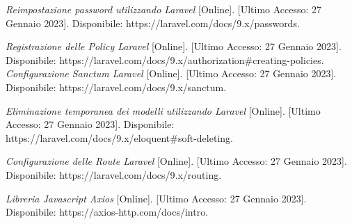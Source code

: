 \begin{thebibliography}{999}
{\em Reimpostazione password utilizzando Laravel} [Online]. [Ultimo Accesso: 27 Gennaio 2023].
Disponibile: https://laravel.com/docs/9.x/passwords.

{\em Registrazione delle Policy Laravel} [Online]. [Ultimo Accesso: 27 Gennaio 2023].
Disponibile: https://laravel.com/docs/9.x/authorization\#creating-policies.
{\em Configurazione Sanctum Laravel} [Online]. [Ultimo Accesso: 27 Gennaio 2023].
Disponibile: https://laravel.com/docs/9.x/sanctum.


{\em Eliminazione temporanea dei modelli utilizzando Laravel} [Online]. [Ultimo Accesso: 27 Gennaio 2023].
Disponibile: https://laravel.com/docs/9.x/eloquent\#soft-deleting.

{\em Configurazione delle Route Laravel} [Online]. [Ultimo Accesso: 27 Gennaio 2023].
Disponibile: https://laravel.com/docs/9.x/routing.

{\em Libreria Javascript Axios} [Online]. [Ultimo Accesso: 27 Gennaio 2023].
Disponibile: https://axios-http.com/docs/intro.




\end{thebibliography}
